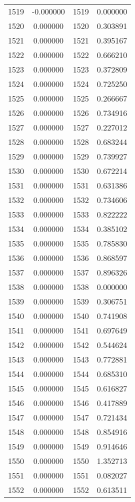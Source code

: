 \documentclass[12pt]{article}
\begin{document}
\begin{longtable}{@{}cccc@{}}
1519 & -0.000000 & 1519 & 0.000000 \\
1520 & 0.000000 & 1520 & 0.303891 \\
1521 & 0.000000 & 1521 & 0.395167 \\
1522 & 0.000000 & 1522 & 0.666210 \\
1523 & 0.000000 & 1523 & 0.372809 \\
1524 & 0.000000 & 1524 & 0.725250 \\
1525 & 0.000000 & 1525 & 0.266667 \\
1526 & 0.000000 & 1526 & 0.734916 \\
1527 & 0.000000 & 1527 & 0.227012 \\
1528 & 0.000000 & 1528 & 0.683244 \\
1529 & 0.000000 & 1529 & 0.739927 \\
1530 & 0.000000 & 1530 & 0.672214 \\
1531 & 0.000000 & 1531 & 0.631386 \\
1532 & 0.000000 & 1532 & 0.734606 \\
1533 & 0.000000 & 1533 & 0.822222 \\
1534 & 0.000000 & 1534 & 0.385102 \\
1535 & 0.000000 & 1535 & 0.785830 \\
1536 & 0.000000 & 1536 & 0.868597 \\
1537 & 0.000000 & 1537 & 0.896326 \\
1538 & 0.000000 & 1538 & 0.000000 \\
1539 & 0.000000 & 1539 & 0.306751 \\
1540 & 0.000000 & 1540 & 0.741908 \\
1541 & 0.000000 & 1541 & 0.697649 \\
1542 & 0.000000 & 1542 & 0.544624 \\
1543 & 0.000000 & 1543 & 0.772881 \\
1544 & 0.000000 & 1544 & 0.685310 \\
1545 & 0.000000 & 1545 & 0.616827 \\
1546 & 0.000000 & 1546 & 0.417889 \\
1547 & 0.000000 & 1547 & 0.721434 \\
1548 & 0.000000 & 1548 & 0.854916 \\
1549 & 0.000000 & 1549 & 0.914646 \\
1550 & 0.000000 & 1550 & 1.352713 \\
1551 & 0.000000 & 1551 & 0.082027 \\
1552 & 0.000000 & 1552 & 0.613511 \\

\end{longtable}
\end{document}
